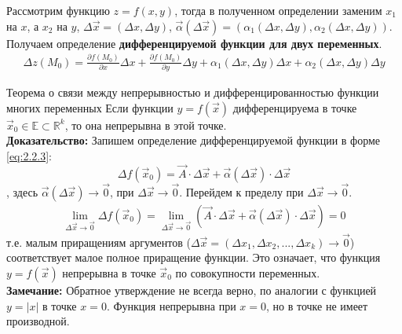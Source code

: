 Рассмотрим функцию $z = f(x,y)$, тогда в полученном определении заменим $x_1$ на $x$, а $x_2$ на $y$, $\Delta \vec{x} = (\Delta x, \Delta y)$, $\vec{\alpha}(\Delta \vec{x}) = (\alpha_1(\Delta x, \Delta y), \alpha_2(\Delta x, \Delta y))$.\\

Получаем определение \textbf{дифференцируемой функции для двух переменных}.
\begin{align} \label{eq:2.2.7}
	\boxed{\Delta z(M_0) = \frac{\partial f(M_0)}{\partial x} \Delta x + \frac{\partial f(M_0)}{\partial y} \Delta y + \alpha_1(\Delta x, \Delta y) \Delta x + \alpha_2 (\Delta x, \Delta y) \Delta y}
\end{align}

\begin{tbox}{Теорема о связи между непрерывностью и дифференцированностью функции многих переменных}
	Если функции $y = f(\vec{x})$ дифференцируема в точке $\vec{x}_0 \in \mathbb{E} \subset \mathbb{R}^k$, то она непрерывна в этой точке.\\

	\textbf{Доказательство:}  Запишем определение дифференцируемой функции в форме \cref{eq:2.2.3}:
	\[\Delta f(\vec{x}_0) = \vec{A} \cdot \Delta \vec{x} + \vec{\alpha}(\Delta \vec{x}) \cdot \Delta \vec{x}\], здесь $\vec{\alpha}(\Delta \vec{x}) \to \vec{0}$, при $\Delta \vec{x} \to \vec{0}$. Перейдем к пределу при $\Delta \vec{x} \to \vec{0}$.
	\begin{align*}
		\lim_{\Delta \vec{x} \to \vec{0}} \Delta f(\vec{x}_0) = \lim_{\Delta \vec{x} \to \vec{0}} \left(\vec{A} \cdot \Delta \vec{x} + \vec{\alpha}(\Delta \vec{x}) \cdot \Delta \vec{x}\right) = 0
	\end{align*}
	т.е. малым приращениям аргументов ($\Delta \vec{x} = (\Delta x_1, \Delta x_2, ..., \Delta x_k) \to \vec{0}$) соответствует малое полное приращение функции. Это означает, что функция $y = f(\vec{x})$ непрерывна в точке $\vec{x}_0$ по совокупности переменных.\\

	\textbf{Замечание:} Обратное утверждение не всегда верно, по аналогии с функцией $y = |x|$ в точке $x = 0$. Функция непрерывна при $x=0$, но в точке не имеет производной.
\end{tbox}